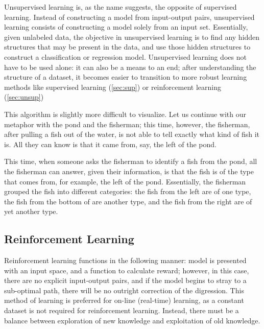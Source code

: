 \documentclass{comjnl}
\numberwithin{equation}{subsection}
\begin{document}
            Unsupervised learning is, as the name suggests, the opposite of supervised learning.
            Instead of constructing a model from input-output pairs, unsupervised learning consists
            of constructing a model solely from an input set. Essentially, given unlabeled data, the
            objective in unsupervised learning is to find any hidden structures that may be present
            in the data, and use those hidden structures to construct a classification or regression
            model. Unsupervised learning does not have to be used alone: it can also be a means to
            an end; after understanding the structure of a dataset, it becomes easier to transition
            to more robust learning methods like supervised learning (\ref{sec:sup}) or
            reinforcement learning (\ref{sec:unsup})

            This algorithm is slightly more difficult to visualize. Let us continue with our
            metaphor with the pond and the fisherman; this time, however, the fisherman, after
            pulling a fish out of the water, is not able to tell exactly what kind of fish it is.
            All they can know is that it came from, say, the left of the pond.

            This time, when someone asks the fisherman to identify a fish from the pond, all the
            fisherman can answer, given their information, is that the fish is of the type that
            comes from, for example, the left of the pond. Essentially, the fisherman grouped the
            fish into different categories: the fish from the left are of one type, the fish from
            the bottom of are another type, and the fish from the right are of yet another type.

        \subsection{Reinforcement Learning}\label{sec:rein}

            Reinforcement learning functions in the following manner: model is presented with an
            input space, and a function to calculate reward; however, in this case, there are no
            explicit input-output pairs, and if the model begins to stray to a sub-optimal path,
            there will be no outright correction of the digression. This method of learning is
            preferred for on-line (real-time) learning, as a constant dataset is not required for
            reinforcement learning. Instead, there must be a balance between exploration of new
            knowledge and exploitation of old knowledge.
\end{document}
